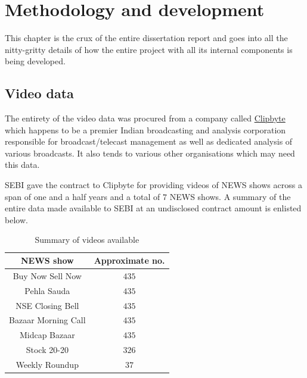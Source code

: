 \chapter{Methodology and development} \label{chapter3}

This chapter is the crux of the entire dissertation report and goes
into all the nitty-gritty details of how the entire project with all
its internal components is being developed.

\vspace{-0.1in}
\section{Video data} \label{vid_data}

The entirety of the video data was procured from a company called
\href{clipbyte.com}{Clipbyte} which happens to be a premier Indian
broadcasting and analysis corporation responsible for
broadcast/telecast management as well as dedicated analysis of
various broadcasts. It also tends to various other organisations
which may need this data. \par

SEBI gave the contract to Clipbyte for providing videos of NEWS shows
across a span of one and a half years and a total of $7$ NEWS shows.
A summary of the entire data made available to SEBI at an undisclosed
contract amount is enlisted below.

\begin{table}[h]
  \def\arraystretch{1.5}
  \centering
  \caption{Summary of videos available}
  \begin{tabular}{|c|c|}
    \hline
    NEWS show           & Approximate no. \\
    \hline
    Buy Now Sell Now    & $435$           \\
    \hline
    Pehla Sauda         & $435$           \\
    \hline
    NSE Closing Bell    & $435$           \\
    \hline
    Bazaar Morning Call & $435$           \\
    \hline
    Midcap Bazaar       & $435$           \\
    \hline
    Stock 20-20         & $326$           \\
    \hline
    Weekly Roundup      & $37$            \\
    \hline
  \end{tabular}
  \label{tab:news_shows_acquired}
\end{table}

